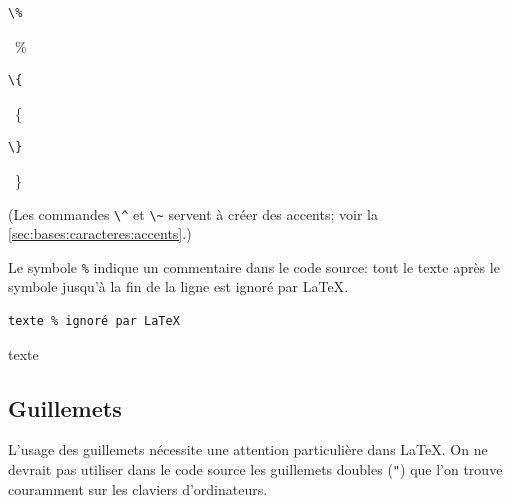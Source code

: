 {\begin{demo}
\begin{minipage}{0.15\linewidth}
    \begin{texample}
\begin{lstlisting}[commentstyle=\mdseries]
\%
\end{lstlisting}
      \producing\ \%
    \end{texample}
  \end{minipage}
  \hfill
  \begin{minipage}{0.15\linewidth}
    \begin{texample}
\begin{lstlisting}
\{
\end{lstlisting}
      \producing\ \{
    \end{texample}
  \end{minipage}
  \hfill
  \begin{minipage}{0.15\linewidth}
    \begin{texample}
\begin{lstlisting}
\}
\end{lstlisting}
      \producing\ \}
    \end{texample}
  \end{minipage}
  \hfill
  \begin{minipage}{0.15\linewidth}
    \mbox{}
  \end{minipage}
  \hfill
\end{demo}
(Les commandes \verb=\^= et \verb=\~= servent à créer des accents;
voir la \autoref{sec:bases:caracteres:accents}.)

Le symbole \verb=%= indique un commentaire dans le code source: tout
le texte après le symbole jusqu'à la fin de la ligne est ignoré par
{\LaTeX}.
\begin{demo}
  \begin{texample}
\begin{lstlisting}
texte % ignoré par LaTeX
\end{lstlisting}
    \producing
    texte %
  \end{texample}
\end{demo}

\subsection{Guillemets}
\label{sec:bases:caracteres:guillemets}

L'usage des guillemets nécessite une attention particulière dans
{\LaTeX}. On ne devrait pas utiliser dans le code source les
guillemets doubles (\verb="=) que l'on trouve couramment sur les
claviers d'ordinateurs.

}
